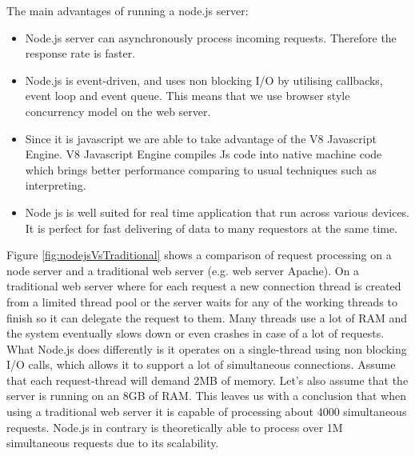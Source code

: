 \documentclass[thesis=M,english]{FITthesis}[2012/10/20]
\begin{document}
The main advantages of running a node.js server:

\begin{itemize}
\item{} Node.js server can asynchronously process incoming requests. Therefore the response rate is faster. 

\item{} Node.js is event-driven, and uses non blocking I/O by utilising callbacks, event loop and event queue. This means that we use browser style concurrency model on the web server.

\item{} Since it is javascript we are able to take advantage of the V8 Javascript Engine. V8 Javascript Engine compiles Js code into native machine code which brings better performance comparing to usual techniques such as interpreting.

\item{} Node js is well suited for real time application that run across various devices. It is perfect for fast delivering of data to many requestors at the same time.
\end{itemize}



Figure \ref{fig:nodejsVsTraditional} shows a comparison of request processing on a node server and a traditional web server (e.g. web server Apache). On a traditional web server where for each request a new connection thread is created from a limited thread pool or the server waits for any of the working threads to finish so it can delegate the request to them. Many threads use a lot of RAM and the system eventually slows down or even crashes in case of a lot of requests.
What Node.js does differently is it operates on a single-thread using non blocking I/O calls, which allows it to support a lot of simultaneous connections.
Assume that each request-thread will demand 2MB of memory. Let's also assume that the server is running on an 8GB of RAM. This leaves us with a conclusion that when using a traditional web server it is capable of processing about 4000 simultaneous requests. Node.js in contrary is theoretically able to process over 1M simultaneous requests due to its scalability. \cite{why-node}
\end{document}
